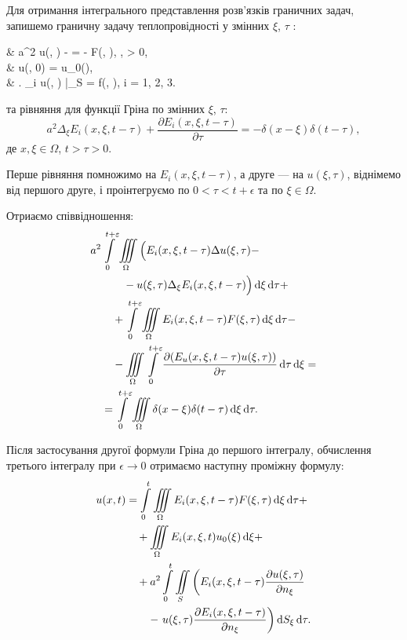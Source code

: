 Для отримання інтегрального представлення розв'язків граничних задач, запишемо граничну задачу теплопровідності у змінних $\xi$, $\tau$ :
\begin{system}
	& a^2 \Delta u(\xi, \tau) -  = - F(\xi, \tau), \quad \xi \in \Omega, \quad \tau > 0, \\
	& u(\xi, 0) = u_0(\xi), \\
	& \left. \ell_i u(\xi, \tau) \right|_{\xi \in S} = f(\xi, \tau), \quad i = 1, 2, 3. 
\end{system}
та рівняння для функції Гріна по змінних $\xi$, $\tau$:
\begin{equation}
	a^2 \Delta_\xi E_i(x, \xi, t - \tau) + \frac{\partial E_i(x, \xi, t - \tau)}{\partial \tau} = - \delta(x - \xi) \delta(t - \tau),
\end{equation}
де $x, \xi \in \Omega$, $ t > \tau > 0$. \medskip

Перше рівняння помножимо на $E_i(x, \xi, t - \tau)$, а друге --- на $u(\xi, \tau)$, віднімемо від першого друге, і проінтегруємо по $0 < \tau < t + \epsilon$ та по $\xi \in \Omega$. \medskip

Отриаємо співвідношення:
\begin{equation}
	\begin{aligned}
		& a^2 \Int_0^{t + \epsilon} \Iiint_\Omega \Big( E_i(x, \xi, t - \tau) \Delta u(\xi, \tau) - \\
		& \qquad \quad - u(\xi, \tau) \Delta_\xi E_i(x, \xi, t - \tau) \Big) \diff \xi \diff \tau + \\
		& \qquad + \Int_0^{t + \epsilon} \Iiint_\Omega E_i(x, \xi, t - \tau) F(\xi, \tau) \diff \xi \diff \tau - \\
		& \qquad - \Iiint_\Omega \Int_0^{t+\epsilon} \frac{\partial (E_u(x, \xi, t - \tau) u(\xi, \tau))}{\partial \tau} \diff \tau \diff \xi = \\
		& \quad = \Int_0^{t + \epsilon} \Iiint_\Omega \delta(x - \xi) \delta(t - \tau) \diff \xi \diff \tau.
	\end{aligned}
\end{equation}

Після застосування другої формули Гріна до першого інтегралу, обчислення третього інтегралу при $\epsilon \to 0$ отримаємо наступну проміжну формулу:
\begin{equation}
	\begin{aligned}
		u(x, t) &= \displaystyle\int\limits_0^t \displaystyle\iiint\limits_\Omega E_i(x, \xi, t - \tau) F(\xi, \tau) \mathop{}\!\mathrm{d} \xi \mathop{}\!\mathrm{d} \tau + \\
		& \quad + \displaystyle\iiint\limits_\Omega E_i(x, \xi, t) u_0(\xi) \mathop{}\!\mathrm{d} \xi + \\
		& \quad + a^2 \displaystyle\int\limits_0^t \displaystyle\iint\limits_S \left( E_i(x, \xi, t - \tau) \frac{\partial u(\xi, \tau)}{\partial n_\xi} \right. \\
		& \qquad - \left. u(\xi, \tau) \frac{\partial E_i(x, \xi, t - \tau)}{\partial n_\xi} \right) \mathop{}\!\mathrm{d} S_\xi \mathop{}\!\mathrm{d} \tau.
	\end{aligned}
\end{equation}

